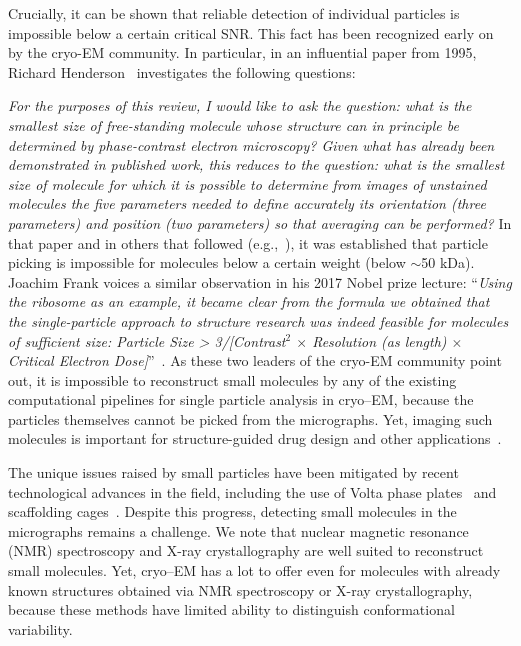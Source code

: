 \documentclass[12pt]{article}
\newcommand{\1}{\mathbf{1}}
\theoremstyle{plain}
\theoremstyle{definition}
\theoremstyle{remark}
\theoremstyle{plain}
\theoremstyle{remark}
\theoremstyle{plain}
\theoremstyle{plain}
\newenvironment{myquote}[1]%
{\list{}{\leftmargin=#1\rightmargin=#1}\item[]}%
{\endlist}
\begin{document}
Crucially, it can be shown that reliable detection of individual particles is impossible below a certain critical SNR. This fact has been recognized early on by the cryo-EM community. In particular, in an influential paper from 1995, Richard Henderson~\cite{henderson1995limitations} investigates the following questions:
\begin{myquote}{10pt}
	\emph{For the purposes of this review, I would like to ask the question: what is the smallest size of free-standing molecule whose structure can in principle be determined by phase-contrast electron microscopy? Given what has already been demonstrated in published work, this reduces to the question: what is the smallest size of molecule for which it is possible to determine from images of unstained molecules the five parameters needed to define accurately its orientation (three parameters) and position (two parameters) so that averaging can be performed?}
\end{myquote}
In that paper and in others that followed (e.g.,~\cite{glaeser1999electron}), it was established that particle picking is impossible for molecules below a certain weight (below $\sim$50 kDa). 
Joachim Frank voices a similar observation in his 2017 Nobel prize lecture: ``\emph{Using the ribosome as an example, it became clear from the formula we obtained that the single-particle approach to structure research was indeed feasible for molecules of sufficient size: Particle Size > 3/[Contrast$^2$ $\times$ Resolution (as length) $\times$ Critical Electron Dose]}''~\cite{frank2018single}. 
As these two leaders of the cryo-EM community point out, it is impossible to reconstruct small molecules by any of the existing computational pipelines for single particle analysis in cryo--EM, because the particles themselves cannot be picked from the micrographs. Yet, imaging such molecules is important for structure-guided drug design and other applications~\cite{scapin2018cryo}.

The unique issues raised by small particles have been mitigated by recent technological advances in the field, including the use of Volta phase plates~\cite{khoshouei2017cryo,liang2017phase} and scaffolding cages~\cite{liu2018nearatomic}.
Despite this progress, detecting small molecules in the micrographs remains a challenge.
We note that nuclear magnetic resonance (NMR) spectroscopy and X-ray crystallography are well suited to reconstruct small molecules. Yet, cryo--EM has a lot to offer even for molecules with already known structures obtained via NMR spectroscopy or X-ray crystallography, because these methods have limited ability to distinguish conformational variability.  
\end{document}
